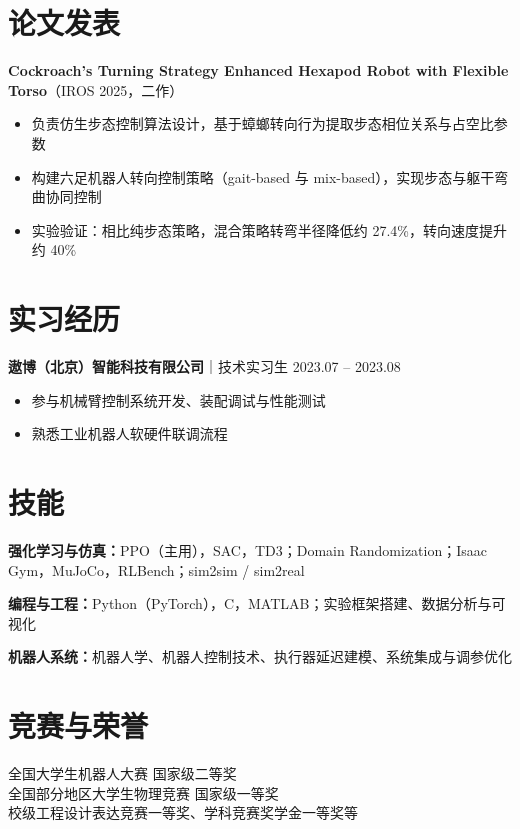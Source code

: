 \documentclass[11pt]{article}
\begin{document}
\vspace{-2pt}

\section{论文发表}

{\small \textbf{Cockroach’s Turning Strategy Enhanced Hexapod Robot with Flexible Torso}\hspace{-0.05em}（IROS 2025，二作）}
\begin{itemize}
\item 负责仿生步态控制算法设计，基于蟑螂转向行为提取步态相位关系与占空比参数
\item 构建六足机器人转向控制策略（gait-based 与 mix-based），实现步态与躯干弯曲协同控制
\item 实验验证：相比纯步态策略，混合策略转弯半径降低约 27.4\%，转向速度提升约 40\%
\end{itemize}
\vspace{-2pt}

\section{实习经历}

\textbf{遨博（北京）智能科技有限公司}｜技术实习生 \hfill 2023.07 – 2023.08
\begin{itemize}
\item 参与机械臂控制系统开发、装配调试与性能测试
\item 熟悉工业机器人软硬件联调流程
\end{itemize}

\vspace{-2pt}

\section{技能}

\textbf{强化学习与仿真：}PPO（主用），SAC，TD3；Domain Randomization；Isaac Gym，MuJoCo，RLBench；sim2sim / sim2real

\textbf{编程与工程：}Python（PyTorch），C，MATLAB；实验框架搭建、数据分析与可视化

\textbf{机器人系统：}机器人学、机器人控制技术、执行器延迟建模、系统集成与调参优化

\vspace{-2pt}

\section{竞赛与荣誉}

全国大学生机器人大赛 国家级二等奖 \\
全国部分地区大学生物理竞赛 国家级一等奖 \\
校级工程设计表达竞赛一等奖、学科竞赛奖学金一等奖等
\end{document}
